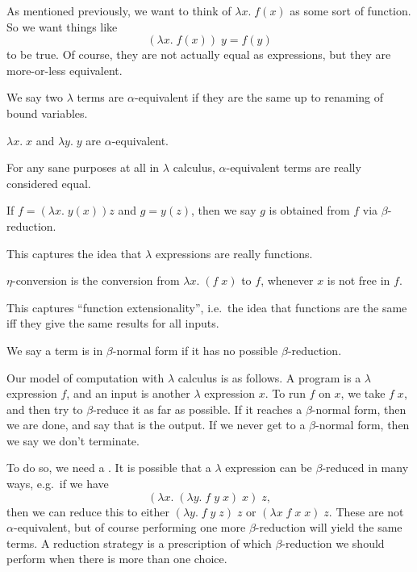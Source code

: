 \documentclass[a4paper]{article}
\begin{document}
As mentioned previously, we want to think of $\lambda x.\; f(x)$ as some sort of function. So we want things like
\[
  (\lambda x.\; f(x))\; y = f(y)
\]
to be true. Of course, they are not actually equal as expressions, but they are more-or-less equivalent.
\begin{defi}
  We say two $\lambda$ terms are $\alpha$-equivalent if they are the same up to renaming of bound variables.
\end{defi}

\begin{eg}
  $\lambda x.\; x$ and $\lambda y.\; y$ are $\alpha$-equivalent.
\end{eg}
For any sane purposes at all in $\lambda$ calculus, $\alpha$-equivalent terms are really considered equal.

\begin{defi}
  If $f = (\lambda x.\; y(x)) z$ and $g = y(z)$, then we say $g$ is obtained from $f$ via $\beta$-reduction.
\end{defi}
This captures the idea that $\lambda$ expressions are really functions.

\begin{defi}
  $\eta$-conversion is the conversion from $\lambda x.\; (f\; x)$ to $f$, whenever $x$ is not free in $f$.
\end{defi}
This captures ``function extensionality'', i.e.\ the idea that functions are the same iff they give the same results for all inputs.

\begin{defi}
  We say a term is in $\beta$-normal form if it has no possible $\beta$-reduction.
\end{defi}
Our model of computation with $\lambda$ calculus is as follows. A program is a $\lambda$ expression $f$, and an input is another $\lambda$ expression $x$. To run $f$ on $x$, we take $f\; x$, and then try to $\beta$-reduce it as far as possible. If it reaches a $\beta$-normal form, then we are done, and say that is the output. If we never get to a $\beta$-normal form, then we say we don't terminate.

To do so, we need a . It is possible that a $\lambda$ expression can be $\beta$-reduced in many ways, e.g.\ if we have
\[
  (\lambda x.\; (\lambda y.\; f\;y\; x)\;x)\;z,
\]
then we can reduce this to either $(\lambda y.\; f\; y\; z)\; z$ or $(\lambda x\; f\; x\; x)\; z$. These are not $\alpha$-equivalent, but of course performing one more $\beta$-reduction will yield the same terms. A reduction strategy is a prescription of which $\beta$-reduction we should perform when there is more than one choice.
\end{document}
